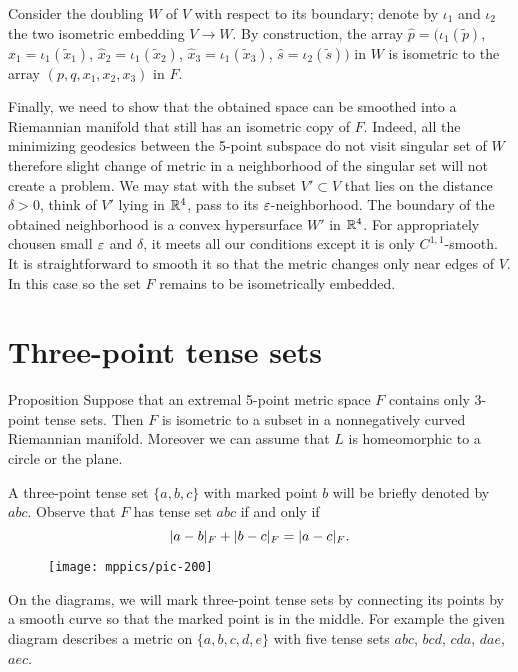 \documentclass{article}
\begin{document}
Consider the doubling $W$ of $V$ with respect to its boundary;
denote by $\iota_1$ and $\iota_2$ the two isometric embedding $V\to W$.
By construction, the array $\hat p=(\iota_1(\tilde p)$, $\hat x_1=\iota_1(\tilde x_1)$, $\hat x_2=\iota_1(\tilde x_2)$, $\hat x_3=\iota_1(\tilde x_3)$,  $\hat s=\iota_2(\tilde s))$ in $W$ is isometric to the array $(p, q, x_1, x_2, x_3)$ in $F$.

Finally, we need to show that the obtained space can be smoothed into a Riemannian manifold that still has an isometric copy of $F$.
Indeed, all the minimizing geodesics between the 5-point subspace do not visit singular set of $W$ therefore slight change of metric in a neighborhood of the singular set will not create a problem.
We may stat with the subset $V'\subset V$ that lies on the distance $\delta>0$,
think of $V'$ lying in $\mathbb{R}^4$, pass to its $\varepsilon$-neighborhood.
The boundary of the obtained neighborhood is a convex hypersurface $W'$ in $\mathbb{R}^4$.
For appropriately chousen small $\varepsilon$ and $\delta$, it meets all our conditions except it is only $C^{1,1}$-smooth.
It is straightforward to smooth it so that the metric changes only near edges of $V$.
In this case so the set $F$ remains to be isometrically embedded.
\qeds


\section{Three-point tense sets}\label{sec:3-tense}

\begin{thm}{Proposition}\label{prop:3-tense}
Suppose that an extremal 5-point metric space $F$ contains only 3-point tense sets.
Then $F$ is isometric to a subset in a nonnegatively curved Riemannian manifold.
Moreover we can assume that $L$ is homeomorphic to a circle or the plane.
\end{thm}

A three-point tense set $\{a,b,c\}$ with marked point $b$ will be briefly denoted by $abc$.
Observe that $F$ has tense set $abc$ if and only if 
\[|a-b|_F+|b-c|_F\z=|a-c|_F.\]

\begin{wrapfigure}{r}{20mm}
\vskip-0mm
\centering
\texttt{[image: mppics/pic-200]}
\end{wrapfigure}

On the diagrams, we will mark three-point tense sets by connecting its points by a smooth curve so that the marked point is in the middle.
For example the given diagram describes a metric on $\{a,b,c,d,e\}$ with five tense sets $abc$, $bcd$, $cda$, $dae$, $aec$.
\end{document}
